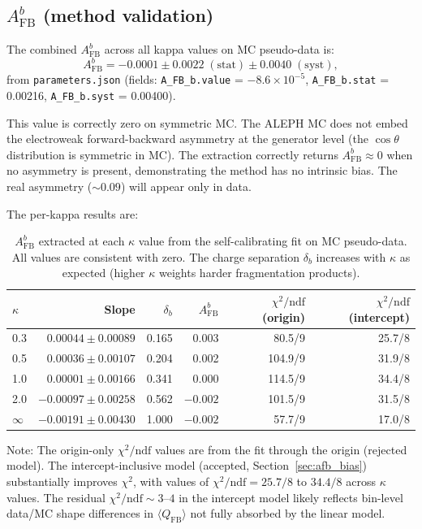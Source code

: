 \documentclass[11pt,a4paper]{article}
\begin{document}
\subsection{$A_\mathrm{FB}^b$ (method validation)}
\label{sec:result_afb}

The combined $A_\mathrm{FB}^b$ across all kappa values on MC pseudo-data is:
\begin{equation}
A_\mathrm{FB}^b = -0.0001 \pm 0.0022\;\mathrm{(stat)} \pm 0.0040\;\mathrm{(syst)},
\label{eq:afb_result}
\end{equation}
from \texttt{parameters.json} (fields: \texttt{A\_FB\_b.value} = $-8.6 \times 10^{-5}$,
\texttt{A\_FB\_b.stat} = 0.00216, \texttt{A\_FB\_b.syst} = 0.00400).

This value is correctly zero on symmetric MC. The ALEPH MC does not embed the
electroweak forward-backward asymmetry at the generator level (the $\cos\theta$
distribution is symmetric in MC). The extraction correctly returns
$A_\mathrm{FB}^b \approx 0$ when no asymmetry is present, demonstrating the method
has no intrinsic bias. The real asymmetry ($\sim 0.09$) will appear only in data.

The per-kappa results are:

\begin{table}[htbp]
\centering
\caption{$A_\mathrm{FB}^b$ extracted at each $\kappa$ value from the self-calibrating
fit on MC pseudo-data. All values are consistent with zero. The charge separation
$\delta_b$ increases with $\kappa$ as expected (higher $\kappa$ weights harder
fragmentation products).}
\label{tab:afb_perkappa}
\begin{tabular}{lrrrrr}
\toprule
$\kappa$ & Slope & $\delta_b$ & $A_\mathrm{FB}^b$ & $\chi^2/\mathrm{ndf}$ (origin) & $\chi^2/\mathrm{ndf}$ (intercept) \\
\midrule
0.3 & $0.00044 \pm 0.00089$ & 0.165 & 0.003 & 80.5/9 & 25.7/8 \\
0.5 & $0.00036 \pm 0.00107$ & 0.204 & 0.002 & 104.9/9 & 31.9/8 \\
1.0 & $0.00001 \pm 0.00166$ & 0.341 & 0.000 & 114.5/9 & 34.4/8 \\
2.0 & $-0.00097 \pm 0.00258$ & 0.562 & $-0.002$ & 101.5/9 & 31.5/8 \\
$\infty$ & $-0.00191 \pm 0.00430$ & 1.000 & $-0.002$ & 57.7/9 & 17.0/8 \\
\bottomrule
\end{tabular}
\end{table}

Note: The origin-only $\chi^2/\mathrm{ndf}$ values are from the fit through the origin
(rejected model). The intercept-inclusive model (accepted, Section~\ref{sec:afb_bias})
substantially improves $\chi^2$, with values of $\chi^2/\mathrm{ndf} = 25.7/8$ to
$34.4/8$ across $\kappa$ values. The residual $\chi^2/\mathrm{ndf} \sim 3$--$4$ in the
intercept model likely reflects bin-level data/MC shape differences in
$\langle Q_\mathrm{FB} \rangle$ not fully absorbed by the linear model.
\end{document}
